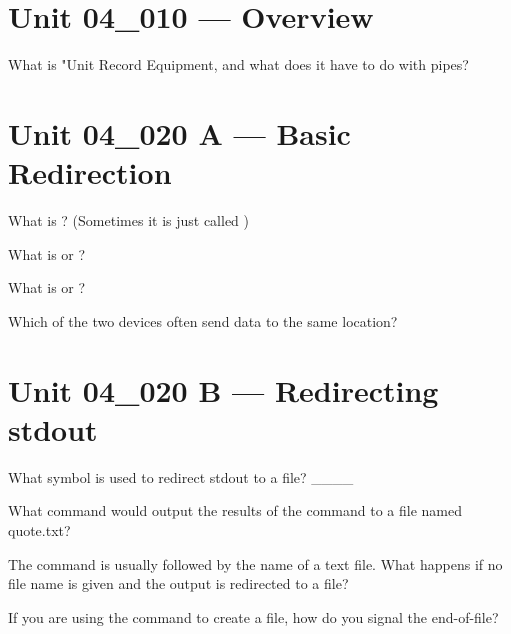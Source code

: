 \documentclass[letterpaper,12pt]{exam}
\newcommand{\unit}{Unit 04}
\begin{document}
\begin {questions}

\section*{\unit\_010 --- Overview} %

\begin{samepage}
	\question What is "Unit Record Equipment, and what does it have to do with pipes?
	\vspace{15mm}
\end{samepage}

\section*{\unit\_020 A --- Basic Redirection} %


\question What is ?
(Sometimes it is just called )
\vspace{5mm}

\question What is  or ?
\vspace{5mm}

\question What is  or ?
\vspace{5mm}

\question Which of the two devices often send data to the same location?
\vspace{5mm}
\section*{\unit\_020 B --- Redirecting stdout} %

\question What symbol is used to redirect stdout to a file? \_\_\_\_

\begin{samepage}
	\question What command would output the results of the  command to a file named quote.txt?
	\vspace{5mm}
\end{samepage}

\begin{samepage}
	\question The  command is usually followed by the name of a text file.  What happens
	if no file name is given and the output is redirected to a file?
	\vspace{15mm}

	\question If you are using the  command to create a file, how do you
	signal the end-of-file?
\end{samepage}

\end{questions}
\end{document}
